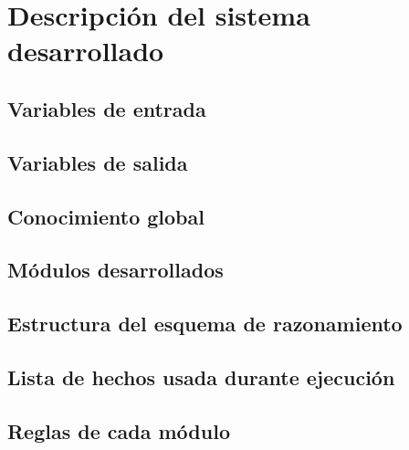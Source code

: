 
\chapter{Descripción del sistema desarrollado}

\section{Variables de entrada}
\section{Variables de salida}
\section{Conocimiento global}
\section{Módulos desarrollados}
\section{Estructura del esquema de razonamiento}
\section{Lista de hechos usada durante ejecución}
\section{Reglas de cada módulo}
